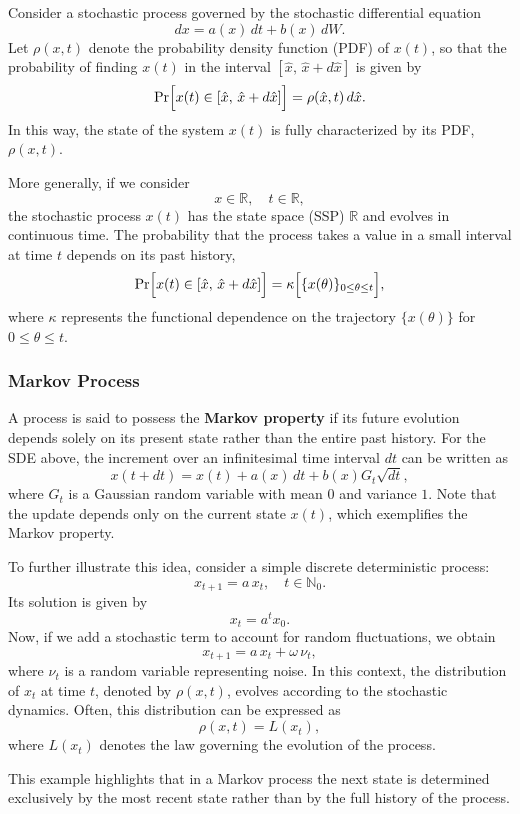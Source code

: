 Consider a stochastic process governed by the stochastic differential equation
$$
dx = a(x)\,dt + b(x)\,dW.
$$
Let $\rho(x,t)$ denote the probability density function (PDF) of $x(t)$, so that the probability of finding $x(t)$ in the interval $[\hat{x},\,\hat{x}+d\hat{x}]$ is given by
$$
\Pr\Bigl[x(t) \in [\hat{x},\,\hat{x}+d\hat{x}]\Bigr] = \rho(\hat{x}, t)\,d\hat{x}.
$$
In this way, the state of the system $x(t)$ is fully characterized by its PDF, $\rho(x,t)$.

More generally, if we consider
$$
x \in \mathbb{R}, \quad t \in \mathbb{R},
$$
the stochastic process $x(t)$ has the state space (SSP) $\mathbb{R}$ and evolves in continuous time. The probability that the process takes a value in a small interval at time $t$ depends on its past history,
$$
\Pr\Bigl[x(t) \in [\hat{x},\,\hat{x}+d\hat{x}]\Bigr] = \kappa\Bigl[\{x(\theta) \}_{0 \le \theta \le t}\Bigr],
$$
where $\kappa$ represents the functional dependence on the trajectory $\{x(\theta)\}$ for $0\le\theta\le t$.

\subsubsection{Markov Process}

A process is said to possess the \textbf{Markov property} if its future evolution depends solely on its present state rather than the entire past history. For the SDE above, the increment over an infinitesimal time interval $dt$ can be written as
$$
x(t+dt) = x(t) + a(x)\,dt + b(x)G_t\sqrt{dt},
$$
where $G_t$ is a Gaussian random variable with mean $0$ and variance $1$. Note that the update depends only on the current state $x(t)$, which exemplifies the Markov property.

To further illustrate this idea, consider a simple discrete deterministic process:
$$
x_{t+1} = a\, x_t, \quad t \in \mathbb{N}_0.
$$
Its solution is given by
$$
x_t = a^t x_0.
$$
Now, if we add a stochastic term to account for random fluctuations, we obtain
$$
x_{t+1} = a\, x_t + \omega\, \nu_t,
$$
where $\nu_t$ is a random variable representing noise. In this context, the distribution of $x_t$ at time $t$, denoted by $\rho(x,t)$, evolves according to the stochastic dynamics. Often, this distribution can be expressed as
$$
\rho(x,t) = L(x_t),
$$
where $L(x_t)$ denotes the law governing the evolution of the process.

This example highlights that in a Markov process the next state is determined exclusively by the most recent state rather than by the full history of the process.
